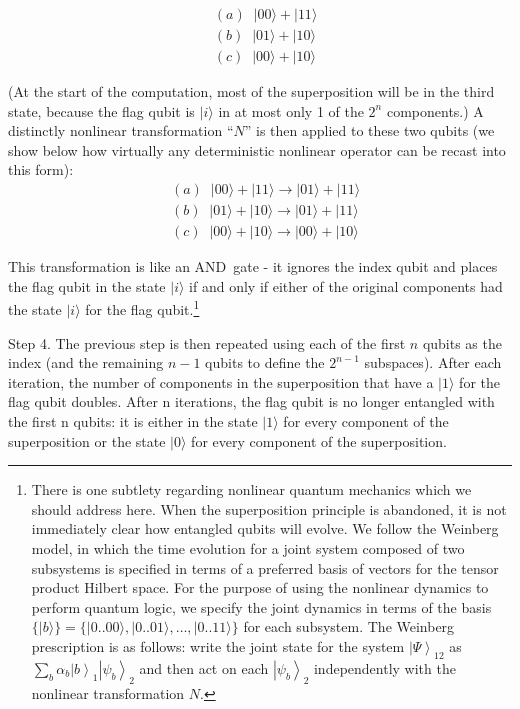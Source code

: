 \documentclass[12pt]{article}
\begin{document}
\begin{align}
&  (a)\;\;|00\rangle+|11\rangle\nonumber\\
&  (b)\;\;|01\rangle+|10\rangle\\
&  (c)\;\;|00\rangle+|10\rangle\nonumber
\end{align}

(At the start of the computation, most of the superposition will be in the
third state, because the flag qubit is
$\vert i \rangle$
in at most only 1 of the $2^{n}$ components.) A distinctly nonlinear
transformation ``$N$'' is then applied to these two qubits (we show below how
virtually any deterministic nonlinear operator can be recast into this form):
\begin{align}
&  (a)\;\;|00\rangle+|11\rangle\longrightarrow|01\rangle+|11\rangle\nonumber\\
&  (b)\;\;|01\rangle+|10\rangle\longrightarrow|01\rangle+|11\rangle\\
&  (c)\;\;|00\rangle+|10\rangle\longrightarrow|00\rangle+|10\rangle\nonumber
\end{align}

This transformation is like an AND\ gate - it ignores the index qubit and
places the flag qubit in the state
$\vert i \rangle$
if and only if either of the original components had the state
$\vert i \rangle$ for the flag qubit.\footnote{There is one subtlety regarding nonlinear quantum
mechanics which we should address here. When the superposition principle is
abandoned, it is not immediately clear how entangled qubits will evolve. We
follow the Weinberg model, in which the time evolution for a joint system
composed of two subsystems is specified in terms of a preferred basis of
vectors for the tensor product Hilbert space. For the purpose of using the
nonlinear dynamics to perform quantum logic, we specify the joint dynamics in
terms of the basis $\{\vert b \rangle\} = \{ \vert 0..00\rangle, \vert 0..01\rangle, \dots ,\vert 0..11\rangle\}$
for each subsystem. The Weinberg prescription is as follows: write the
joint state for the system $\left|  \Psi\right\rangle _{12}$ as $\sum
\limits_{b}\alpha_{b}\left|  b\right\rangle _{1}\left|  \psi_{b}\right\rangle
_{2}$ and then act on each $\left|  \psi_{b}\right\rangle _{2}$ independently
with the nonlinear transformation $N$.}

Step 4. The previous step is then repeated using each of the first $n$ qubits as
the index (and the remaining $n-1$ qubits to define the $2^{n-1}$ subspaces).
After each iteration, the number of components in the superposition that have
a
$\vert 1 \rangle$
for the flag qubit doubles. After n iterations, the flag qubit is no longer
entangled with the first n qubits: it is either in the state
$\vert 1 \rangle$ for every component of the superposition or the state
$\vert 0 \rangle$ for every component of the superposition.
\end{document}
